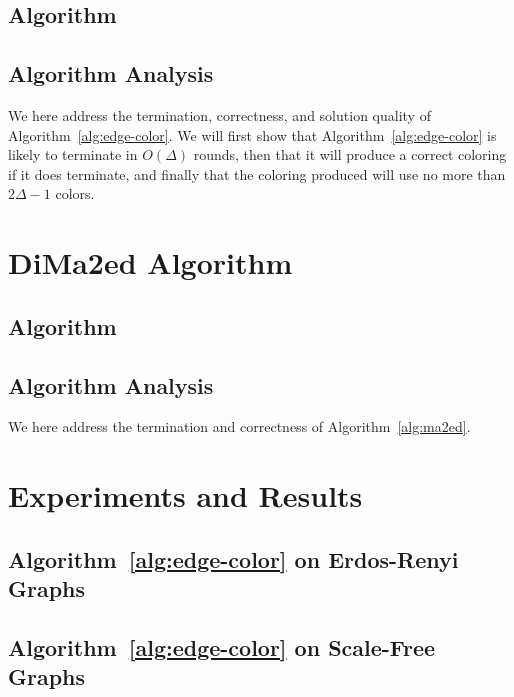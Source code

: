 \documentclass[conference, 10pt, letter]{IEEEtran}
\begin{document}
\subsection{Algorithm}



\subsection{Algorithm Analysis}

We here address the termination, correctness, and solution quality of Algorithm~\ref{alg:edge-color}. We will first show that Algorithm~\ref{alg:edge-color} is likely to terminate in $O(\Delta)$ rounds, then that it will produce a correct coloring if it does terminate, and finally that the coloring produced will use no more than $2\Delta - 1$ colors.





\section{DiMa2ed Algorithm}
\subsection{Algorithm}
\label{sub:dima2ed-description}


\subsection{Algorithm Analysis}
We here address the termination and correctness of Algorithm~\ref{alg:ma2ed}.

\section{Experiments and Results}
\subsection{Algorithm~\ref{alg:edge-color}  on Erdos-Renyi Graphs}

\subsection{Algorithm~\ref{alg:edge-color} on Scale-Free Graphs}
\label{sub:experiment:scalefree}

\end{document}
